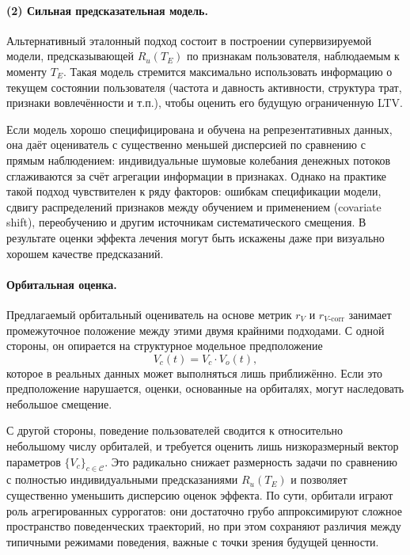 \paragraph{(2) Сильная предсказательная модель.}


Альтернативный эталонный подход состоит в построении
супервизируемой модели, предсказывающей $R_u(T_E)$ по признакам
пользователя, наблюдаемым к моменту $T_E$. Такая модель стремится
максимально использовать информацию о текущем состоянии пользователя
(частота и давность активности, структура трат, признаки вовлечённости
и т.п.), чтобы оценить его будущую ограниченную LTV.

Если модель хорошо специфицирована и обучена на репрезентативных
данных, она даёт оцениватель с существенно меньшей дисперсией по
сравнению с прямым наблюдением: индивидуальные шумовые колебания
денежных потоков сглаживаются за счёт агрегации информации в признаках.
Однако на практике такой подход чувствителен к ряду факторов:
ошибкам спецификации модели, сдвигу распределений признаков между
обучением и применением (covariate shift), переобучению и другим
источникам систематического смещения. В результате оценки эффекта
лечения могут быть искажены даже при визуально хорошем качестве
предсказаний.


\paragraph{Орбитальная оценка.}

Предлагаемый орбитальный оцениватель на основе метрик $r_V$ и
$r_{V\text{-corr}}$ занимает промежуточное положение между этими двумя
крайними подходами. С одной стороны, он опирается на структурное
модельное предположение
\[
  V_c(t) = V_c \cdot V_o(t),
\]
которое в реальных данных может выполняться лишь приближённо. Если
это предположение нарушается, оценки, основанные на орбиталях, могут
наследовать небольшое смещение.

С другой стороны, поведение пользователей сводится к относительно
небольшому числу орбиталей, и требуется оценить лишь низкоразмерный
вектор параметров $\{V_c\}_{c \in \mathcal{C}}$. Это радикально
снижает размерность задачи по сравнению с полностью индивидуальными
предсказаниями $R_u(T_E)$ и позволяет существенно уменьшить дисперсию
оценок эффекта. По сути, орбитали играют роль агрегированных суррогатов:
они достаточно грубо аппроксимируют сложное пространство
поведенческих траекторий, но при этом сохраняют различия между
типичными режимами поведения, важные с точки зрения будущей ценности.

